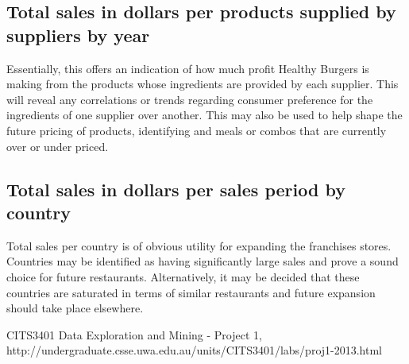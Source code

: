 \documentclass[11pt, a4paper]{article}
\begin{document}
\subsection*{Total sales in dollars per products supplied by suppliers by year}

Essentially, this offers an indication of how much profit Healthy Burgers is making from the products whose ingredients are provided by each supplier. This will reveal any correlations or trends regarding consumer preference for the ingredients of one supplier over another. This may also be used to help shape the future pricing of products, identifying and meals or combos that are currently over or under priced.

\subsection*{Total sales in dollars per sales period by country}

Total sales per country is of obvious utility for expanding the franchises stores. Countries may be identified as having significantly large sales and prove a sound choice for future restaurants. Alternatively, it may be decided that these countries are saturated in terms of similar restaurants and future expansion should take place elsewhere.

\begin{thebibliography}{9}

	CITS3401 Data Exploration and Mining - Project 1,
	http://undergraduate.csse.uwa.edu.au/units/CITS3401/labs/proj1-2013.html
		
\end{thebibliography}



\appendix
\end{document}
